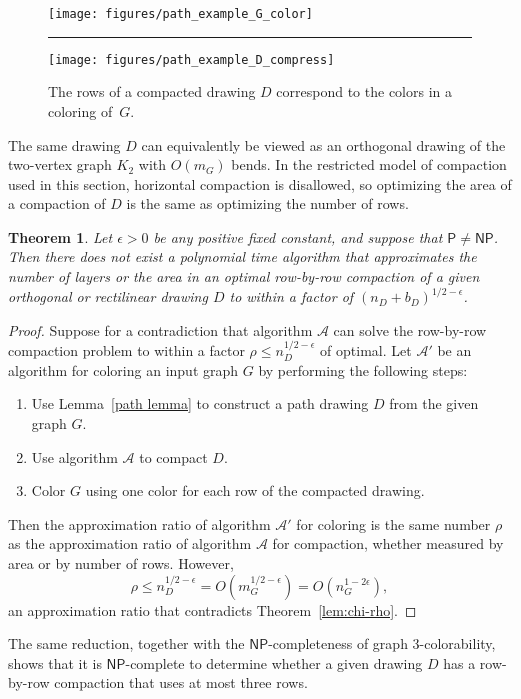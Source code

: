 \documentclass[12pt]{article}
\newtheorem{theorem}{Theorem}
\theoremstyle{definitions}
\renewcommand{\P}{\mathsf{P}}
\newcommand{\NP}{\mathsf{NP}}
\begin{document}
\begin{figure}[t]
\centering
\texttt{[image: figures/path\_example\_G\_color]}\rule{4em}{0em}
\texttt{[image: figures/path\_example\_D\_compress]}
\caption{The rows of a compacted drawing $D$ correspond to the colors in a coloring of~$G$.}
\label{fig:row-by-row-coloring}
\end{figure}

The same drawing $D$ can equivalently be viewed as an orthogonal drawing of the two-vertex graph $K_2$ with $O(m_G)$ bends. In the restricted model of compaction used in this section, horizontal compaction is disallowed, so optimizing the area of a compaction of $D$ is the same as optimizing the number of rows.

\begin{theorem}
\label{thm:row-by-row}
Let $\epsilon>0$ be any positive fixed constant, and suppose that $\P \neq \NP$.
Then there does not exist a polynomial time algorithm that
approximates the number of layers or the area in an optimal row-by-row compaction of a
given orthogonal or rectilinear drawing $D$ to within a factor of $(n_D+b_D)^{1/2-\epsilon}$. 
\end{theorem}

\begin{proof}
Suppose for a contradiction that algorithm $\mathcal{A}$ can solve the row-by-row compaction problem to within a factor $\rho \le n_D^{1/2-\epsilon}$ of optimal. Let $\mathcal{A}'$ be an algorithm for  coloring an input graph $G$ by performing the following steps:
\begin{enumerate}
\item Use Lemma~\ref{path lemma} to construct a path drawing $D$ from the given graph $G$.
\item Use algorithm $\mathcal{A}$ to compact $D$.
\item Color $G$ using one color for each row of the compacted drawing.
\end{enumerate}
Then the approximation ratio of algorithm $\mathcal{A}'$ for coloring is the same number $\rho$ as the approximation ratio of algorithm $\mathcal{A}$ for compaction, whether measured by area or by number of rows. However,
$$\rho\le n_D^{1/2-\epsilon}=O(m_G^{1/2-\epsilon})=O(n_G^{1-2\epsilon}),$$
an approximation ratio that contradicts Theorem~\ref{lem:chi-rho}.
\end{proof}

The same reduction, together with the $\NP$-completeness of graph 3-color\-ability, shows that it is $\NP$-complete to determine whether a given drawing $D$ has a row-by-row compaction that uses at most three rows.
\end{document}
